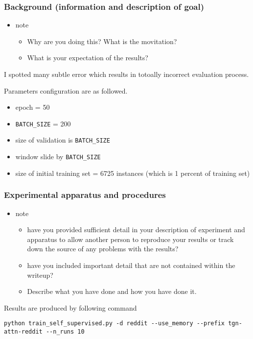 \documentclass[11pt]{article}
\begin{document}
\subsubsection{Background (information and description of goal)}
\label{sec:org9cc5b04}
\begin{itemize}
\item note
\begin{itemize}
\item Why are you doing this? What is the movitation?
\item What is your expectation of the results?
\end{itemize}
\end{itemize}
I spotted many subtle error which results in totoally incorrect evaluation process.

Parameters configuration are as followed.

\begin{itemize}
\item epoch = 50
\item \texttt{BATCH\_SIZE} = 200
\item size of validation is \texttt{BATCH\_SIZE}
\item window slide by \texttt{BATCH\_SIZE}
\item size of initial training set = 6725 instances (which is 1 percent of training set)
\end{itemize}
\subsubsection{Experimental apparatus and procedures}
\label{sec:org6b77321}
\begin{itemize}
\item note
\begin{itemize}
\item have you provided sufficient detail in your description of experiment and apparatus to allow another person to reproduce your results or track down the source of any problems with the results?
\item have you included important detail that are not contained within the writeup?
\item Describe what you have done and how you have done it.
\end{itemize}
\end{itemize}

Results are produced by following command
\begin{verbatim}
python train_self_supervised.py -d reddit --use_memory --prefix tgn-attn-reddit --n_runs 10
\end{verbatim}
\end{document}
